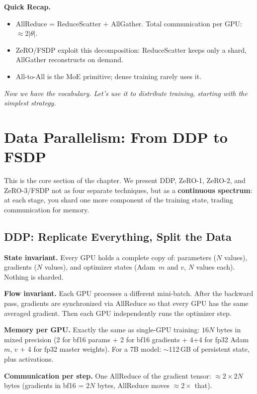 \begin{quickrecap}
\textbf{Quick Recap.}
\begin{itemize}[nosep,leftmargin=1.5em]
  \item AllReduce = ReduceScatter + AllGather. Total communication per GPU: $\approx 2|\theta|$.
  \item ZeRO/FSDP exploit this decomposition: ReduceScatter keeps only a shard, AllGather reconstructs on demand.
  \item All-to-All is the MoE primitive; dense training rarely uses it.
\end{itemize}
\textit{Now we have the vocabulary. Let's use it to distribute training, starting with the simplest strategy.}
\end{quickrecap}


\section{Data Parallelism: From DDP to FSDP}
\label{sec:ddp-to-fsdp}

This is the core section of the chapter. We present DDP, ZeRO-1, ZeRO-2, and ZeRO-3/FSDP not as four separate techniques, but as a \textbf{continuous spectrum}: at each stage, you shard one more component of the training state, trading communication for memory.

\subsection{DDP: Replicate Everything, Split the Data}

\textbf{State invariant.} Every GPU holds a complete copy of: parameters ($N$ values), gradients ($N$ values), and optimizer states (Adam~$m$ and $v$, $N$ values each). Nothing is sharded.

\textbf{Flow invariant.} Each GPU processes a different mini-batch. After the backward pass, gradients are synchronized via AllReduce so that every GPU has the same averaged gradient. Then each GPU independently runs the optimizer step.

\textbf{Memory per GPU.} Exactly the same as single-GPU training: $16N$ bytes in mixed precision (2 for bf16 params + 2 for bf16 gradients + 4+4 for fp32 Adam $m$, $v$ + 4 for fp32 master weights). For a 7B model: $\sim$112\,GB of persistent state, plus activations.

\textbf{Communication per step.} One AllReduce of the gradient tensor: $\approx 2 \times 2N$ bytes (gradients in bf16 = $2N$ bytes, AllReduce moves $\approx 2\times$ that).

